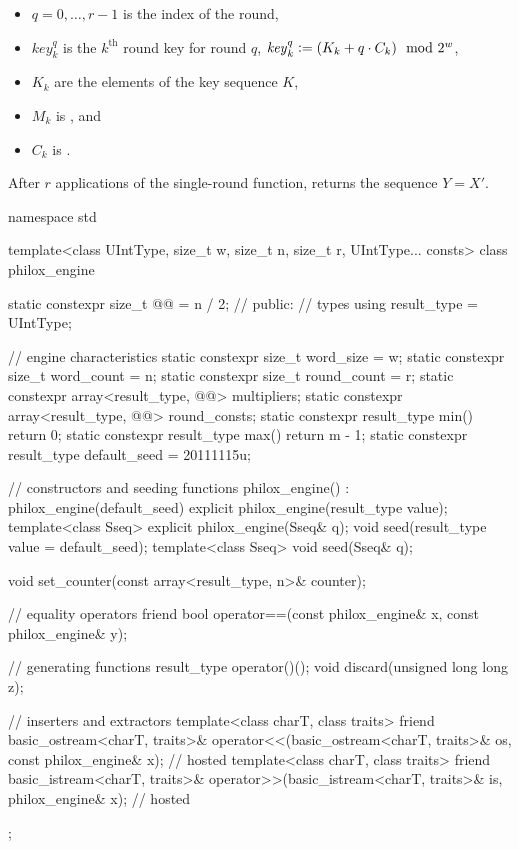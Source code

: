 \begin{itemize}
\begin{itemize}
  \item
  $q = 0, \dotsc, r - 1$ is the index of the round,

  \item
  $\mathit{key}^q_k$ is the $k^\text{th}$ round key for round $q$,
  $\mathit{key}^q_k \mathrel{\mathop:}= (K_k + q \cdot C_k) \mod 2^w$,

  \item
  $K_k$ are the elements of the key sequence $K$,

  \item
  $M_k$ is , and

  \item
  $C_k$ is .
  \end{itemize}
\end{itemize}

\pnum
After $r$ applications of the single-round function,
 returns the sequence $Y = X'$.

%
%
\begin{codeblock}
namespace std {
  template<class UIntType, size_t w, size_t n, size_t r, UIntType... consts>
  class philox_engine {
    static constexpr size_t @@ = n / 2;   // \expos
  public:
    // types
    using result_type = UIntType;

    // engine characteristics
    static constexpr size_t word_size = w;
    static constexpr size_t word_count = n;
    static constexpr size_t round_count = r;
    static constexpr array<result_type, @@> multipliers;
    static constexpr array<result_type, @@> round_consts;
    static constexpr result_type min() { return 0; }
    static constexpr result_type max() { return m - 1; }
    static constexpr result_type default_seed = 20111115u;

    // constructors and seeding functions
    philox_engine() : philox_engine(default_seed) {}
    explicit philox_engine(result_type value);
    template<class Sseq> explicit philox_engine(Sseq& q);
    void seed(result_type value = default_seed);
    template<class Sseq> void seed(Sseq& q);

    void set_counter(const array<result_type, n>& counter);

    // equality operators
    friend bool operator==(const philox_engine& x, const philox_engine& y);

    // generating functions
    result_type operator()();
    void discard(unsigned long long z);

    // inserters and extractors
    template<class charT, class traits>
      friend basic_ostream<charT, traits>&
        operator<<(basic_ostream<charT, traits>& os, const philox_engine& x);   // hosted
    template<class charT, class traits>
      friend basic_istream<charT, traits>&
        operator>>(basic_istream<charT, traits>& is, philox_engine& x);         // hosted
  };
}
\end{codeblock}

